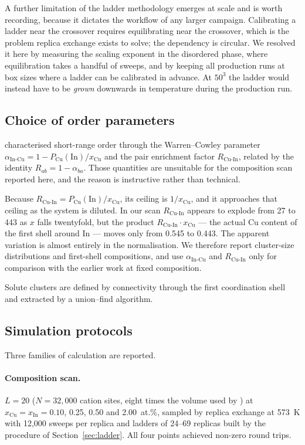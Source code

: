 \documentclass[11pt,a4paper]{article}
\newcommand{\aInCu}{\alpha_{\mathrm{In\text{-}Cu}}}
\newcommand{\RCuIn}{R_{\mathrm{Cu\text{-}In}}}
\begin{document}
A further limitation of the ladder methodology emerges at scale and is worth
recording, because it dictates the workflow of any larger campaign. Calibrating
a ladder near the crossover requires equilibrating near the crossover, which is
the problem replica exchange exists to solve; the dependency is circular. We
resolved it here by measuring the scaling exponent in the disordered phase,
where equilibration takes a handful of sweeps, and by keeping all production
runs at box sizes where a ladder can be calibrated in advance. At $50^3$ the
ladder would instead have to be \emph{grown} downwards in temperature during the
production run.

\subsection{Choice of order parameters}
\label{sec:orderparams}

\citet{yu2026} characterised short-range order through the Warren--Cowley
parameter $\aInCu = 1 - P_{\mathrm{Cu}}(\mathrm{In})/x_{\mathrm{Cu}}$ and the
pair enrichment factor $\RCuIn$, related by the identity $R_{ab} = 1 -
\alpha_{ba}$. Those quantities are unsuitable for the composition scan reported
here, and the reason is instructive rather than technical.

Because $\RCuIn = P_{\mathrm{Cu}}(\mathrm{In})/x_{\mathrm{Cu}}$, its ceiling is
$1/x_{\mathrm{Cu}}$, and it approaches that ceiling as the system is diluted. In
our scan $\RCuIn$ appears to explode from 27 to 443 as $x$ falls twentyfold, but
the product $\RCuIn \cdot x_{\mathrm{Cu}}$ --- the actual Cu content of the first
shell around In --- moves only from 0.545 to 0.443. The apparent variation is
almost entirely in the normalisation. We therefore report cluster-size
distributions and first-shell compositions, and use $\aInCu$ and $\RCuIn$ only
for comparison with the earlier work at fixed composition.

Solute clusters are defined by connectivity through the first coordination
shell and extracted by a union--find algorithm. 

\subsection{Simulation protocols}
\label{sec:protocols}

Three families of calculation are reported.

\paragraph{Composition scan.} $L = 20$ ($N = 32{,}000$ cation sites, eight times
the volume used by \citealt{yu2026}) at
$x_{\mathrm{Cu}} = x_{\mathrm{In}} = 0.10$, 0.25, 0.50 and 2.00~at.\%, sampled
by replica exchange at 573~K with 12{,}000 sweeps per replica and ladders of
24--69 replicas built by the procedure of Section~\ref{sec:ladder}. All four
points achieved non-zero round trips.
\end{document}
